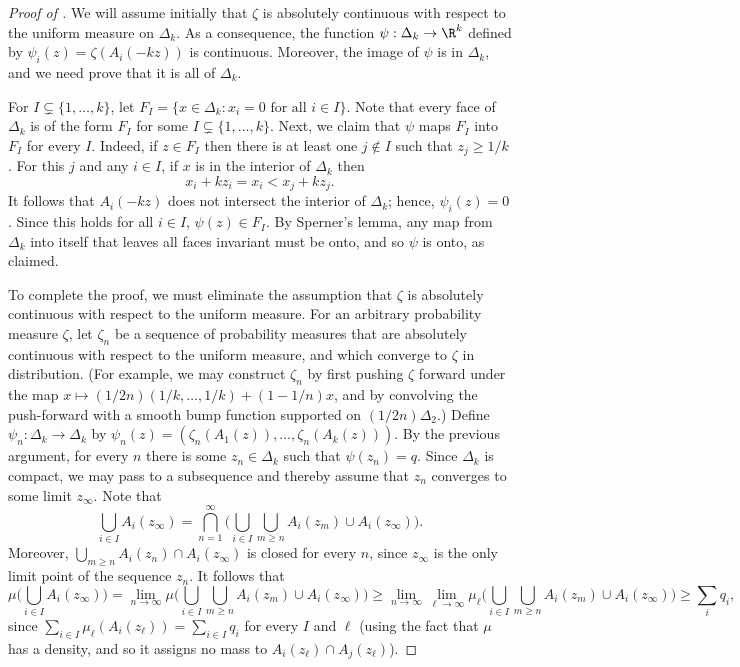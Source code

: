 \documentclass{toc}
\begin{document}
\begin{proof}[Proof of ]
  We will assume initially that $\zeta$ is absolutely continuous with respect to the
  uniform measure on $\Delta_k$. As a consequence, the function $\psi: \Delta_k \to \R^k$ defined by
  $\psi_i(z) = \zeta(A_i(-kz))$
  is continuous. Moreover, the image of $\psi$ is in $\Delta_k$, and we need prove that it is all of $\Delta_k$.
  
  For $I \subsetneq \{1, \dots, k\}$, let $F_I = \{x \in \Delta_k: x_i = 0 \text{ for all } i \in I\}$. Note that
  every face of $\Delta_k$ is of the form $F_I$ for some $I \subsetneq \{1, \dots, k\}$.
  Next, we claim that $\psi$ maps $F_I$ into $F_I$ for every $I$. Indeed, if $z \in F_I$ then there is at least one $j \not \in I$
  such that $z_j \ge 1/k$. For this $j$ and any $i \in I$, if $x$ is in the interior of $\Delta_k$ then
  \[
    x_i + k z_i = x_i < x_j + k z_j.
  \]
  It follows that $A_i(-kz)$ does not intersect the interior
  of $\Delta_k$; hence, $\psi_i(z) = 0$. Since this holds for all $i \in I$, $\psi(z) \in F_I$.
  By Sperner's lemma, any map from $\Delta_k$ into itself that leaves all faces invariant must be onto, and so
  $\psi$ is onto, as claimed.

  To complete the proof, we must eliminate the assumption that $\zeta$ is absolutely continuous with
  respect to the uniform measure. For an arbitrary probability measure $\zeta$, let $\zeta_n$ be a sequence of
  probability measures that are absolutely continuous with respect to the uniform measure, and which converge to $\zeta$ in distribution. (For example, we may construct $\zeta_n$ by first pushing $\zeta$ forward under the map $x \mapsto ({1}/{2n}) (1/k, \dots, 1/k) + (1 - 1/n) x$, and by convolving the push-forward with a smooth bump function supported on $({1}/{2n}) \Delta_2$.) Define $\psi_n: \Delta_k \to \Delta_k$
  by $\psi_n(z) = (\zeta_n(A_1(z)), \dots, \zeta_n(A_k(z)))$.
  By the previous argument, for every $n$ there is some $z_n \in \Delta_k$ such that $\psi(z_n) = q$. Since
  $\Delta_k$ is compact, we may pass to a subsequence and thereby assume that $z_n$ converges to some limit $z_\infty$.
  Note that
  \[
    \bigcup_{i \in I} A_i(z_\infty) = \bigcap_{n=1}^\infty \Big(\bigcup_{i \in I} \bigcup_{m \ge n} A_i(z_m) \cup A_i(z_\infty)\Big).
  \]
  Moreover, $\bigcup_{m \ge n} A_i(z_n) \cap A_i(z_\infty)$ is closed for every $n$, since $z_\infty$ is the only
  limit point of the sequence $z_n$. It follows that
  \[
    \mu\Big(\bigcup_{i \in I} A_i(z_\infty)\Big)
    = \lim_{n \to \infty} \mu\Big(\bigcup_{i \in I} \bigcup_{m \ge n} A_i(z_m) \cup A_i(z_\infty)\Big)
    \ge \lim_{n \to \infty} \lim_{\ell \to \infty} \mu_\ell\Big(\bigcup_{i \in I} \bigcup_{m \ge n} A_i(z_m) \cup A_i(z_\infty)\Big)
    \ge \sum_i q_i,
  \]
  since $\sum_{i \in I} \mu_\ell(A_i(z_\ell)) = \sum_{i \in I} q_i$ for every $I$ and $\ell$
  (using the fact that $\mu$ has a density, and so it assigns no mass to $A_i(z_\ell) \cap A_j(z_\ell)$).
  \end{proof}
\end{document}
